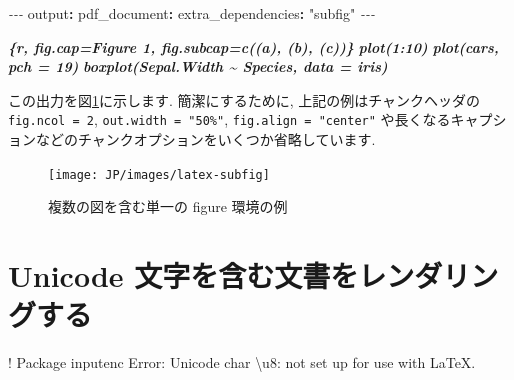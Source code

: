 \documentclass[
  11pt,
  lualatex,ja=standard,jafont=noto]{bxjsreport}
\newenvironment{Shaded}{\begin{snugshade}}{\end{snugshade}}
\newcommand{\AttributeTok}[1]{\textcolor[rgb]{0.77,0.63,0.00}{#1}}
\newcommand{\FunctionTok}[1]{\textcolor[rgb]{0.00,0.00,0.00}{#1}}
\newcommand{\InformationTok}[1]{\textcolor[rgb]{0.56,0.35,0.01}{\textbf{\textit{#1}}}}
\newcommand{\KeywordTok}[1]{\textcolor[rgb]{0.13,0.29,0.53}{\textbf{#1}}}
\newcommand{\NormalTok}[1]{#1}
\newcommand{\PreprocessorTok}[1]{\textcolor[rgb]{0.56,0.35,0.01}{\textit{#1}}}
\newcommand{\StringTok}[1]{\textcolor[rgb]{0.31,0.60,0.02}{#1}}
\begin{document}
\begin{Shaded}
\begin{Highlighting}[]
\PreprocessorTok{{-}{-}{-}}
\FunctionTok{output}\KeywordTok{:}
\AttributeTok{  }\FunctionTok{pdf\_document}\KeywordTok{:}
\AttributeTok{    }\FunctionTok{extra\_dependencies}\KeywordTok{:}\AttributeTok{ }\StringTok{"subfig"}
\PreprocessorTok{{-}{-}{-}}
\end{Highlighting}
\end{Shaded}

\begin{Shaded}
\begin{Highlighting}[]
\InformationTok{\textasciigrave{}\textasciigrave{}\textasciigrave{}\{r, fig.cap=\textquotesingle{}Figure 1\textquotesingle{}, fig.subcap=c(\textquotesingle{}(a)\textquotesingle{}, \textquotesingle{}(b)\textquotesingle{}, \textquotesingle{}(c)\textquotesingle{})\}}
\InformationTok{plot(1:10)}
\InformationTok{plot(cars, pch = 19)}
\InformationTok{boxplot(Sepal.Width \textasciitilde{} Species, data = iris)}
\InformationTok{\textasciigrave{}\textasciigrave{}\textasciigrave{}}
\end{Highlighting}
\end{Shaded}

この出力を図\ref{fig:latex-subfig}に示します. 簡潔にするために, 上記の例はチャンクヘッダの \texttt{fig.ncol = 2}, \texttt{out.width = "50\%"}, \texttt{fig.align = "center"} や長くなるキャプションなどのチャンクオプションをいくつか省略しています.

\begin{figure}

{\centering \texttt{[image: JP/images/latex-subfig]} 

}

\caption{複数の図を含む単一の figure 環境の例}\label{fig:latex-subfig}
\end{figure}

\hypertarget{latex-unicode}{%
\section{Unicode 文字を含む文書をレンダリングする}\label{latex-unicode}}

\begin{Shaded}
\begin{Highlighting}[]
\NormalTok{! Package inputenc Error:}
\NormalTok{  Unicode char }\FunctionTok{\textbackslash{}u}\NormalTok{8: not set up for use with LaTeX.}
\end{Highlighting}
\end{Shaded}
\end{document}
